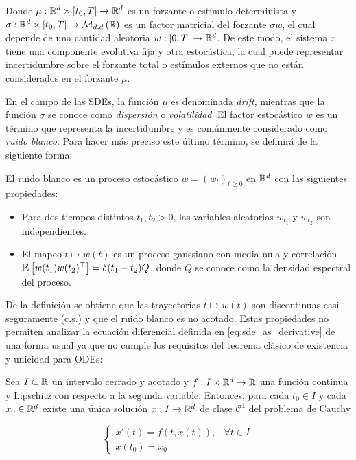 Donde $\mu:\mathbb{R}^d\times [t_0,T]\to\mathbb{R}^d$ es un forzante o estímulo determinista y $\sigma:\mathbb{R}^d\times [t_0,T]\to\mathcal{M}_{d,d}\left(\mathbb{R}\right)$ es un factor matricial del forzante $\sigma w$, el cual depende de una cantidad aleatoria $w:[0,T]\to\mathbb{R}^d$. De este modo, el sistema $x$ tiene una componente evolutiva fija y otra estocástica, la cual puede representar incertidumbre sobre el forzante total o estímulos externos que no están considerados en el forzante $\mu$.

En el campo de las SDEs, la función $\mu$ es denominada \textit{drift}, mientras que la función $\sigma$ se conoce como \textit{dispersión} o \textit{volatilidad}. El factor estocástico $w$ es un término que representa la incertidumbre y es comúnmente considerado como \textit{ruido blanco}. Para hacer más preciso este último término, se definirá de la siguiente forma:

\begin{defn}
    El ruido blanco es un proceso estocástico $w=(w_t)_{t\geq 0}$ en $\mathbb{R}^d$ con las siguientes propiedades:

    \begin{itemize}
        \item Para dos tiempos distintos $t_1, t_2>0$, las variables aleatorias $w_{t_1}$ y $w_{t_2}$ son independientes.
        \item El mapeo $t\mapsto w(t)$ es un proceso gaussiano con media nula y correlación $\mathbb{E}_{}\left[w(t_1)w(t_2)^\top\right]=\delta(t_1-t_2)Q$, donde $Q$ se conoce como la densidad espectral del proceso.
    \end{itemize}
\end{defn}

De la definición se obtiene que las trayectorias $t\mapsto w(t)$ son discontinuas casi seguramente (c.s.) y que el ruido blanco es no acotado. Estas propiedades no permiten analizar la ecuación diferencial definida en \eqref{eq:sde_as_derivative} de una forma usual ya que no cumple los requisitos del teorema clásico de existencia y unicidad para ODEs:

\begin{teo}
    \label{teo:cauchy_picard}
    Sea $I\subset\mathbb{R}$ un intervalo cerrado y acotado y $f:I\times\mathbb{R}^d\to\mathbb{R}$ una función continua y Lipschitz con respecto a la segunda variable. Entonces, para cada $t_0\in I$ y cada $x_0\in\mathbb{R}^d$ existe una única solución $x:I\to\mathbb{R}^d$ de clase $\mathcal{C}^1$ del problema de Cauchy

    \begin{equation*}
        \begin{cases}
            x'(t) = f(t,x(t)), & \forall t\in I \\
            x(t_0) = x_0
        \end{cases}
    \end{equation*}

\end{teo}

